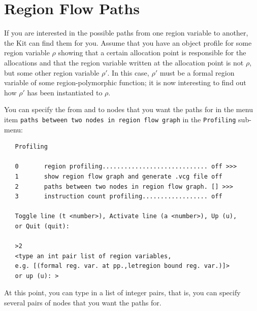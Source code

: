 \documentclass[12pt]{book}
\begin{document}
\section{Region Flow Paths\label{regFlowPath.sec}}
If you are interested in the possible paths
%
from one region variable to another, the Kit can find them for you.
Assume that you have an object profile for some region variable $\rho$
showing that a certain allocation point is responsible for the
allocations and that the region variable written at the allocation
point is not $\rho$, but some other region variable $\rho'$. In this
case, $\rho'$ must be a formal region variable of some
region-polymorphic function; it is now interesting to find out how
$\rho'$ has been instantiated to $\rho$.

You can specify the from and to nodes that you want the paths for in
the menu item
%
{\tt paths between two nodes in region flow graph} in the {\tt Profiling}
sub-menu:
\begin{verbatim}
   Profiling

   0       region profiling............................. off >>>
   1       show region flow graph and generate .vcg file off
   2       paths between two nodes in region flow graph. [] >>>
   3       instruction count profiling.................. off 

   Toggle line (t <number>), Activate line (a <number>), Up (u), 
   or Quit (quit): 

   >2
   <type an int pair list of region variables,
   e.g. [(formal reg. var. at pp.,letregion bound reg. var.)]> 
   or up (u): >
\end{verbatim}

At this point, you can type in a list of integer pairs, that is, you
can specify several pairs of nodes that you want the paths for.
\end{document}
